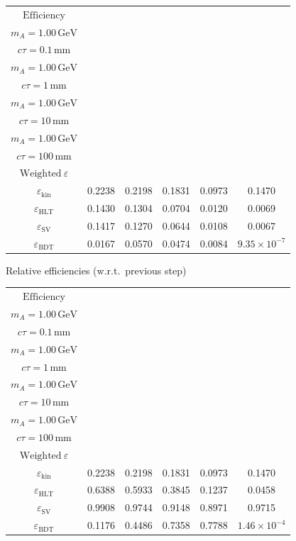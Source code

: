 \documentclass[10pt,a4paper]{article}
\begin{document}
{\begin{tabular}{cccccc}
\toprule
$\mathrm{Efficiency}$ & \shortstack{$m_{\pi}=10\,\mathrm{GeV}$\\$m_{A}=1.00\,\mathrm{GeV}$\\$c\tau=0.1\,\mathrm{mm}$} & \shortstack{$m_{\pi}=10\,\mathrm{GeV}$\\$m_{A}=1.00\,\mathrm{GeV}$\\$c\tau=1\,\mathrm{mm}$} & \shortstack{$m_{\pi}=10\,\mathrm{GeV}$\\$m_{A}=1.00\,\mathrm{GeV}$\\$c\tau=10\,\mathrm{mm}$} & \shortstack{$m_{\pi}=10\,\mathrm{GeV}$\\$m_{A}=1.00\,\mathrm{GeV}$\\$c\tau=100\,\mathrm{mm}$} & \shortstack{$\mathrm{QCD}$\\$\mathrm{Weighted}\ \varepsilon$} \\
\midrule
$\varepsilon_{\mathrm{kin}}$ & 0.2238 & 0.2198 & 0.1831 & 0.0973 & 0.1470\\
$\varepsilon_{\mathrm{HLT}}$ & 0.1430 & 0.1304 & 0.0704 & 0.0120 & 0.0069\\
$\varepsilon_{\mathrm{SV}}$ & 0.1417 & 0.1270 & 0.0644 & 0.0108 & 0.0067\\
$\varepsilon_{\mathrm{BDT}}$ & 0.0167 & 0.0570 & 0.0474 & 0.0084 & $9.35\times10^{-7}$\\
\bottomrule
\end{tabular}

\vspace{18pt}

Relative efficiencies (w.r.t.\ previous step)

\begin{tabular}{cccccc}
\toprule
$\mathrm{Efficiency}$ & \shortstack{$m_{\pi}=10\,\mathrm{GeV}$\\$m_{A}=1.00\,\mathrm{GeV}$\\$c\tau=0.1\,\mathrm{mm}$} & \shortstack{$m_{\pi}=10\,\mathrm{GeV}$\\$m_{A}=1.00\,\mathrm{GeV}$\\$c\tau=1\,\mathrm{mm}$} & \shortstack{$m_{\pi}=10\,\mathrm{GeV}$\\$m_{A}=1.00\,\mathrm{GeV}$\\$c\tau=10\,\mathrm{mm}$} & \shortstack{$m_{\pi}=10\,\mathrm{GeV}$\\$m_{A}=1.00\,\mathrm{GeV}$\\$c\tau=100\,\mathrm{mm}$} & \shortstack{$\mathrm{QCD}$\\$\mathrm{Weighted}\ \varepsilon$} \\
\midrule
$\varepsilon_{\mathrm{kin}}$ & 0.2238 & 0.2198 & 0.1831 & 0.0973 & 0.1470\\
$\varepsilon_{\mathrm{HLT}}$ & 0.6388 & 0.5933 & 0.3845 & 0.1237 & 0.0458\\
$\varepsilon_{\mathrm{SV}}$ & 0.9908 & 0.9744 & 0.9148 & 0.8971 & 0.9715\\
$\varepsilon_{\mathrm{BDT}}$ & 0.1176 & 0.4486 & 0.7358 & 0.7788 & $1.46\times10^{-4}$\\
\bottomrule
\end{tabular}

}
\end{document}
